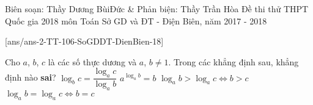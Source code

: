 \begin{name}
{Biên soạn: Thầy Dương BùiĐức \& Phản biện: Thầy Trần Hòa}
		{Đề thi thử THPT Quốc gia 2018 môn Toán Sở GD và ĐT - Điện Biên, năm 2017 - 2018}
	\end{name}
\setcounter{ex}{0}
[ans/ans-2-TT-106-SoGDDT-DienBien-18]
\begin{ex}%
Cho $ a $, $ b $, $ c $ là các số thực dương và $ a$, $b\neq 1 $. Trong các khẳng định sau, khẳng định nào \textbf{sai}?
\choice
{$ \log_{b}c=\dfrac{\log_{a}c}{\log_{a}b} $}
{$ a^{\log_{a}b}=b $}
{\True $ \log_{a}b>\log_{a}c\Leftrightarrow b>c $}
{$ \log_{a}b=\log_{a}c\Leftrightarrow b=c $}
\end{ex}
